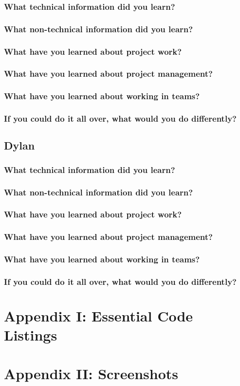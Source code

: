 \documentclass[onecolumn, draftclsnofoot,10pt, compsoc]{IEEEtran}
\begin{document}
    \subsubsection{What technical information did you learn?}
    \subsubsection{What non-technical information did you learn?}
    \subsubsection{What have you learned about project work?}
    \subsubsection{What have you learned about project management?}
    \subsubsection{What have you learned about working in teams?}
    \subsubsection{\textbf{If you could do it all over, what would you do differently?}}

  \subsection{Dylan}
    \subsubsection{What technical information did you learn?}
    \subsubsection{What non-technical information did you learn?}
    \subsubsection{What have you learned about project work?}
    \subsubsection{What have you learned about project management?}
    \subsubsection{What have you learned about working in teams?}
    \subsubsection{\textbf{If you could do it all over, what would you do differently?}}

\section{Appendix I: Essential Code Listings}

\section{Appendix II: Screenshots}
\end{document}
